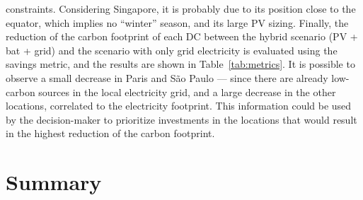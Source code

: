 constraints. Considering Singapore, it is probably due to its position close to the equator, which implies no ``winter'' season, and its large PV sizing. Finally, the reduction of the carbon footprint of each DC between the hybrid scenario (PV + bat + grid) and the scenario with only grid electricity is evaluated using the  savings metric, and the results are shown in Table~\ref{tab:metrics}. It is possible to observe a small decrease in Paris and S\~ao Paulo --- since there are already low-carbon sources in the local electricity grid, and a large decrease in the other locations, correlated to the electricity footprint. This information could be used by the decision-maker to prioritize investments in the locations that would result in the highest reduction of the carbon footprint.


\section{Summary}
\label{sec:conclusion_ccgrid}

